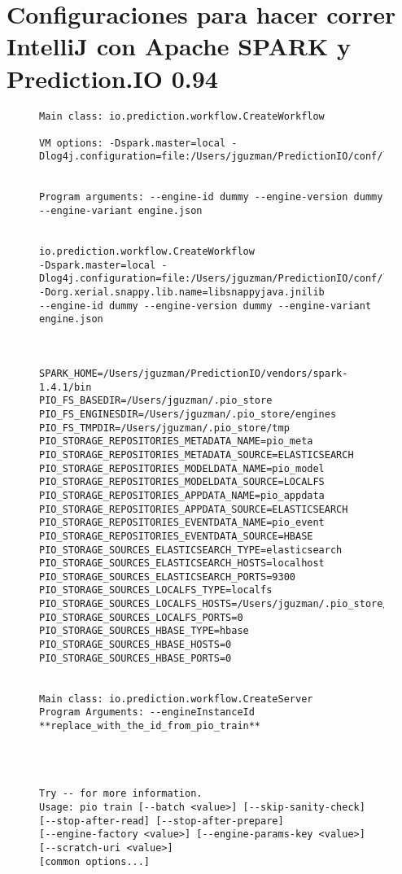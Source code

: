 \newpage
\section{Configuraciones para hacer correr IntelliJ con Apache SPARK y Prediction.IO 0.94}



\begin{figure}[tb]%
	\centering
	
	
\begin{lstlisting}[frame=single,basicstyle=\ttfamily\tiny,]
Main class: io.prediction.workflow.CreateWorkflow

VM options: -Dspark.master=local -Dlog4j.configuration=file:/Users/jguzman/PredictionIO/conf/log4j.properties


Program arguments: --engine-id dummy --engine-version dummy --engine-variant engine.json


io.prediction.workflow.CreateWorkflow
-Dspark.master=local -Dlog4j.configuration=file:/Users/jguzman/PredictionIO/conf/log4j.properties -Dorg.xerial.snappy.lib.name=libsnappyjava.jnilib 
--engine-id dummy --engine-version dummy --engine-variant engine.json



SPARK_HOME=/Users/jguzman/PredictionIO/vendors/spark-1.4.1/bin
PIO_FS_BASEDIR=/Users/jguzman/.pio_store
PIO_FS_ENGINESDIR=/Users/jguzman/.pio_store/engines
PIO_FS_TMPDIR=/Users/jguzman/.pio_store/tmp
PIO_STORAGE_REPOSITORIES_METADATA_NAME=pio_meta
PIO_STORAGE_REPOSITORIES_METADATA_SOURCE=ELASTICSEARCH
PIO_STORAGE_REPOSITORIES_MODELDATA_NAME=pio_model
PIO_STORAGE_REPOSITORIES_MODELDATA_SOURCE=LOCALFS
PIO_STORAGE_REPOSITORIES_APPDATA_NAME=pio_appdata
PIO_STORAGE_REPOSITORIES_APPDATA_SOURCE=ELASTICSEARCH
PIO_STORAGE_REPOSITORIES_EVENTDATA_NAME=pio_event
PIO_STORAGE_REPOSITORIES_EVENTDATA_SOURCE=HBASE
PIO_STORAGE_SOURCES_ELASTICSEARCH_TYPE=elasticsearch
PIO_STORAGE_SOURCES_ELASTICSEARCH_HOSTS=localhost
PIO_STORAGE_SOURCES_ELASTICSEARCH_PORTS=9300
PIO_STORAGE_SOURCES_LOCALFS_TYPE=localfs
PIO_STORAGE_SOURCES_LOCALFS_HOSTS=/Users/jguzman/.pio_store/models
PIO_STORAGE_SOURCES_LOCALFS_PORTS=0
PIO_STORAGE_SOURCES_HBASE_TYPE=hbase
PIO_STORAGE_SOURCES_HBASE_HOSTS=0
PIO_STORAGE_SOURCES_HBASE_PORTS=0


Main class: io.prediction.workflow.CreateServer
Program Arguments: --engineInstanceId **replace_with_the_id_from_pio_train**




Try -- for more information.
Usage: pio train [--batch <value>] [--skip-sanity-check]
[--stop-after-read] [--stop-after-prepare]
[--engine-factory <value>] [--engine-params-key <value>]
[--scratch-uri <value>]
[common options...]


\end{lstlisting}
\end{figure}
